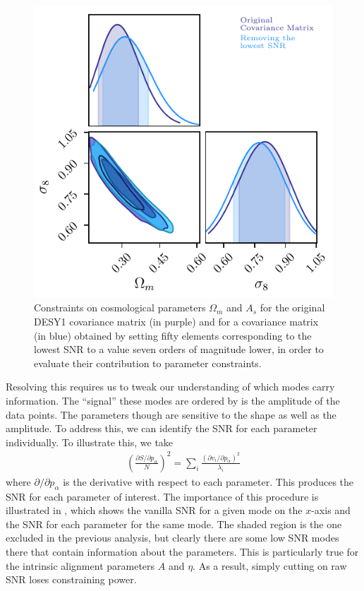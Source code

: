 \documentclass[twocolumn]{\docclass}
\newcommand\be{\begin{equation}}
\newcommand\ee{\end{equation}}
\def\bea{\begin{eqnarray}}
\def\eea{\end{eqnarray}}
\begin{document}
	\begin{figure}
		\includegraphics[width=0.9\columnwidth]{SNR/SNR_wm-sigma8.pdf}
		\caption{Constraints on cosmological parameters $\Omega_m$ and $A_s$ for the original DESY1 covariance matrix (in purple) and for a covariance matrix (in blue) obtained by setting fifty elements corresponding to the lowest SNR to a value seven orders of magnitude lower, in order to evaluate their contribution to parameter constraints. \label{fig:signalnoise}}
	\end{figure}
	


Resolving this requires us to tweak our understanding of which modes carry information. The ``signal'' these modes are ordered by is the amplitude of the data points.  The parameters though are sensitive to the shape as well as the amplitude.
To address this, we can identify the SNR for each parameter individually. To illustrate this, we take
	\bea
	\left(\frac{\partial S/\partial p_\alpha}{N}\right)^2 = \sum_{i} \frac{(\partial v_i / \partial p_\alpha)^2}{\lambda_i}
	\eea
	where $\partial /\partial p_\alpha$ is the derivative with respect to each parameter. This produces the SNR for each parameter of interest. The importance of this procedure is illustrated in , which shows the vanilla SNR for a given mode on the $x$-axis and the SNR for each parameter for the same mode. The shaded region is the one excluded in the previous analysis, but clearly there are some low SNR modes there that contain information about the parameters. This is particularly true for the intrinsic alignment parameters $A$ and $\eta$. As a result, simply cutting on raw SNR loses 
constraining power. 
	
\end{document}
